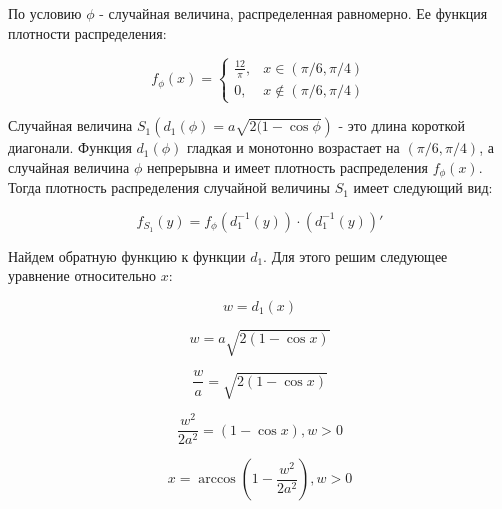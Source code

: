 \documentclass[]{article}
\begin{document}
	\vspace{10pt}
	
	По условию $\phi$ - случайная величина, распределенная равномерно. Ее функция плотности распределения:
	
	\begin{equation}
	f_\phi(x) = 
	\begin{cases}
	\frac{12}{\pi}, & x \in (\pi/6, \pi/4)\\
	0, & x \notin (\pi/6, \pi/4)
	\end{cases}
	\end{equation}
	
	\vspace{10pt}
	
	Случайная величина $S_1(d_1(\phi) = a\sqrt{2(1-\cos\phi})$ - это длина короткой диагонали. Функция $d_1(\phi)$ гладкая и монотонно возрастает на $(\pi/6, \pi/4)$, а случайная величина $\phi$ непрерывна и имеет плотность распределения $f_\phi(x)$. Тогда плотность распределения случайной величины $S_1$ имеет следующий вид:
	
	\vspace{10pt}
	
	\begin{equation}
	f_{S_1}(y) = f_\phi(d_1^{-1}(y)) \cdot (d_1^{-1}(y))'
	\end{equation}
	
	\vspace{10pt}
	
	Найдем обратную функцию к функции $d_1$. Для этого решим следующее уравнение относительно $x$:
	
	\begin{equation}
	w = d_1(x)
	\end{equation}
	
	\begin{equation}
	w = a\sqrt{2(1-\cos x)}
	\end{equation}
	
	\begin{equation}
	\frac{w}{a} = \sqrt{2(1-\cos x)}
	\end{equation}
	
	\begin{equation}
	\frac{w^2}{2a^2} = (1-\cos x), w > 0
	\end{equation}
	
	\begin{equation}
	x = \arccos(1 - \frac{w^2}{2a^2}), w > 0
	\end{equation}
	
	\vspace{10pt}
	
\end{document}
